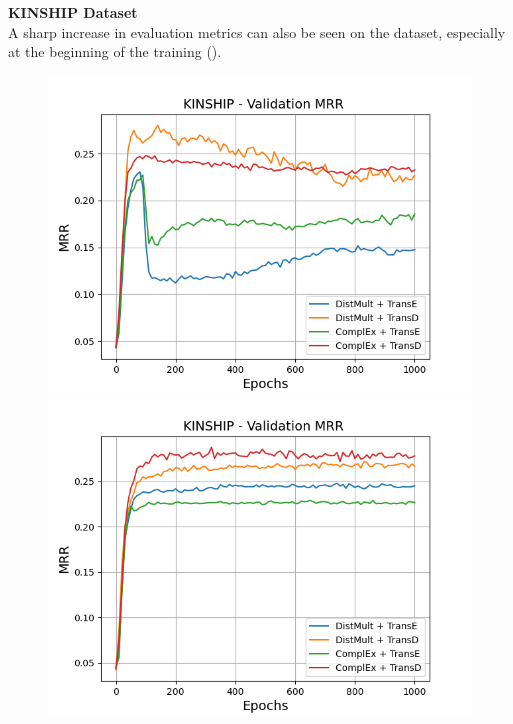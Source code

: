 \textbf{KINSHIP Dataset}
\label{subsubsec:methods_kinship}\\
%
A sharp increase in evaluation metrics can also be seen on the \kinship dataset, especially at the beginning of the training ().
\begin{figure}[H]
    \centering
    \begin{minipage}{.5\textwidth}
      \centering
      \includegraphics[width=0.9\linewidth]{figures/results/gan_train/not_pretrained/uncertainty/max/entropy/kinship/1k_epochs/uncertainty_kinship_mrrs.png}
    \end{minipage}%
    \begin{minipage}{.5\textwidth}
      \centering
      \includegraphics[width=0.9\linewidth]{figures/results/gan_train/not_pretrained/uncertainty/max_distribution/entropy/kinship/1k_epochs/uncertainty_kinship_mrrs.png}

\end{minipage}
\end{figure}
